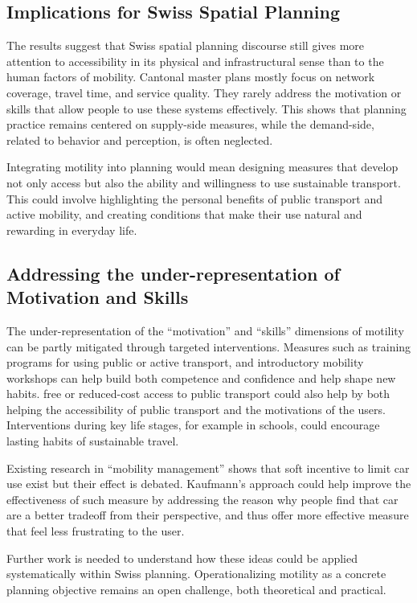 \subsection{Implications for Swiss Spatial Planning}

The results suggest that Swiss spatial planning discourse still gives more attention to accessibility in its physical and infrastructural sense than to the human factors of mobility. Cantonal master plans mostly focus on network coverage, travel time, and service quality. They rarely address the motivation or skills that allow people to use these systems effectively. This shows that planning practice remains centered on supply-side measures, while the demand-side, related to behavior and perception, is often neglected.

Integrating motility into planning would mean designing measures that develop not only access but also the ability and willingness to use sustainable transport. This could involve highlighting the personal benefits of public transport and active mobility, and creating conditions that make their use natural and rewarding in everyday life.

\newpage 

\subsection{Addressing the under-representation of Motivation and Skills}

The under-representation of the “motivation” and “skills” dimensions of motility can be partly mitigated through targeted interventions. Measures such as training programs for using public or active transport, and introductory mobility workshops can help build both competence and confidence and help shape new habits. free or reduced-cost access to public transport could also help by both helping the accessibility of public transport and the motivations of the users. Interventions during key life stages, for example in schools, could encourage lasting habits of sustainable travel.

Existing research in “mobility management”\cite{noauthor_impact_nodate} \cite{moser_effectiveness_2008} shows that soft incentive to limit car use exist but their effect is debated\cite{wall_response_2011}. Kaufmann's approach could help improve the effectiveness of such measure by addressing the reason why people find that car are a better tradeoff from their perspective, and thus offer more effective measure that feel less frustrating to the user.

Further work is needed to understand how these ideas could be applied systematically within Swiss planning. Operationalizing motility as a concrete planning objective remains an open challenge, both theoretical and practical.


